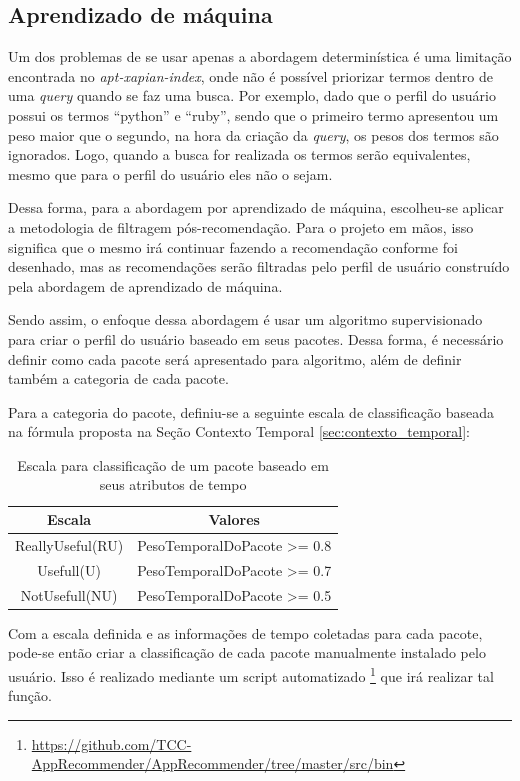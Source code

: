 \subsection{Aprendizado de máquina}

Um dos problemas de se usar apenas a abordagem determinística é uma limitação
encontrada no \textit{apt-xapian-index}, onde não é possível priorizar termos
dentro de uma \textit{query} quando se faz uma busca. Por exemplo, dado que o perfil
do usuário possui os termos ``python'' e ``ruby'', sendo que o primeiro termo
apresentou um peso maior que o segundo, na hora da criação da \textit{query}, os pesos
dos termos são ignorados. Logo, quando a busca for realizada os termos serão
equivalentes, mesmo que para o perfil do usuário eles não o sejam.

Dessa forma, para a abordagem por aprendizado de máquina, escolheu-se aplicar a
metodologia de filtragem pós-recomendação. Para o projeto em mãos, isso
significa que o mesmo irá continuar fazendo a recomendação conforme foi
desenhado, mas as recomendações serão filtradas pelo perfil de usuário
construído pela abordagem de aprendizado de máquina.

Sendo assim, o enfoque dessa abordagem é usar um algoritmo supervisionado
para criar o perfil do usuário baseado em seus pacotes. Dessa forma, é
necessário definir como cada pacote será apresentado para algoritmo, além de
definir também a categoria de cada pacote.

Para a categoria do pacote, definiu-se a seguinte escala de classificação baseada na
fórmula proposta na Seção Contexto Temporal \ref{sec:contexto_temporal}:

\begin{table}[h]
\centering
\begin{tabular}{cc}
\hline
\rowcolor[HTML]{EFEFEF}
{Escala} & {Valores} \\ \hline
{ReallyUseful(RU)}  & PesoTemporalDoPacote >= 0.8                  \\ \hline
{Usefull(U)}   & PesoTemporalDoPacote >= 0.7                  \\ \hline
{NotUsefull(NU)}   & PesoTemporalDoPacote >= 0.5                  \\ \hline
\end{tabular}
\caption{Escala para classificação de um pacote baseado em seus atributos de tempo}
\label{tab:classificacao_pacotes}
\end{table}


Com a escala definida e as informações de tempo coletadas para cada pacote,
pode-se então criar a classificação de cada pacote manualmente instalado pelo
usuário.
Isso é realizado mediante um script automatizado \footnote{\url{https://github.com/TCC-AppRecommender/AppRecommender/tree/master/src/bin}}
que irá realizar tal função.

